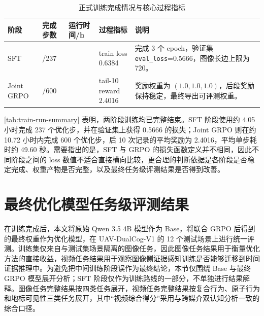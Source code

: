 \begin{table}[!htbp]
    \centering
    \caption{正式训练完成情况与核心过程指标}
    \label{tab:train-run-summary}
    \footnotesize
    \setlength{\tabcolsep}{4pt}
    \begin{tabularx}{\textwidth}{@{}p{1.9cm}>{\centering\arraybackslash}p{1.6cm}>{\centering\arraybackslash}p{1.6cm}>{\centering\arraybackslash}p{2.0cm}X@{}}
        \toprule
        阶段 & 完成步数 & 运行时间/h & 过程指标 & 说明 \\
        \midrule
        SFT & 237/237 & 4.05 & \makecell[c]{train loss\\0.6384} & 完成 3 个 epoch，验证集 \texttt{eval\_loss}=0.5666，图像长边上限为 720。 \\
        Joint GRPO & 600/600 & 10.72 & \makecell[c]{tail-10 reward\\2.4016} & 奖励权重为 \((1.0,1.0,1.0)\)，后段奖励保持稳定，最终导出可评测权重。 \\
        \bottomrule
    \end{tabularx}
\end{table}

\autoref{tab:train-run-summary} 表明，两阶段训练均已完整结束。SFT 阶段使用约 4.05 小时完成 237 个优化步，并在验证集上获得 0.5666 的损失；Joint GRPO 则在约 10.72 小时内完成 600 个优化步，后 10 次记录的平均奖励为 2.4016，平均单步耗时约 49.60 秒。需要指出的是，SFT 与 GRPO 的损失函数定义并不相同，因此不同阶段之间的 loss 数值不适合直接横向比较，更合理的判断依据是各阶段是否稳定完成、权重产物是否完整，以及最终任务级评测结果是否得到改善。

\FloatBarrier
\section{最终优化模型任务级评测结果}

在训练完成后，本文将原始 Qwen 3.5 4B 模型作为 Base，将联合 GRPO 后得到的最终权重作为优化模型，在 UAV-DualCog-V1 的 12 个测试场景上进行统一评测。训练集仅来自与测试集场景隔离的图像任务，因此图像任务结果用于衡量优化方法的直接收益，视频任务结果用于观察图像侧证据感知训练是否能够迁移到时间证据推理中。为避免把中间训练阶段误作为最终结论，本节仅围绕 Base 与最终 GRPO 模型展开分析；SFT 阶段仅作为训练路线的一部分，不单独进行结果解释。图像任务完整结果按四类任务展开，视频任务完整结果按复合行为、原子行为和地标可见性三类任务展开，其中“视频综合得分”采用与跨媒介双认知分析一致的综合口径。

